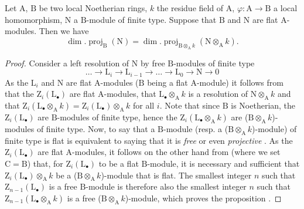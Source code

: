 \begin{proposition}[6.2.3]
\label{IV.6.2.3}
Let $\mathrm{A}$, $\mathrm{B}$ be two local Noetherian rings, $k$ the residue field of $\mathrm{A}$, $\varphi:\mathrm{A}\to\mathrm{B}$ a local homomorphism, $\mathrm{N}$ a $\mathrm{B}$-module of finite type.
Suppose that $\mathrm{B}$ and $\mathrm{N}$ are flat $\mathrm{A}$-modules.
Then we have
\begin{equation}
  \dim.\operatorname{proj}_\mathrm{B}(\mathrm{N})=\dim.\operatorname{proj}_{\mathrm{B}\otimes_\mathrm{A} k}(\mathrm{N}\otimes_\mathrm{A} k).
  \label{IV.6.2.3.1}
\tag{6.2.3.1}
\end{equation}
\end{proposition}

\begin{proof}
Consider a left resolution of $\mathrm{N}$ by free $\mathrm{B}$-modules of finite type
\[
  \ldots\to\mathrm{L}_i\to\mathrm{L}_{i-1}\to\ldots\to\mathrm{L}_0\to\mathrm{N}\to 0
\]
As the $\mathrm{L}_i$ and $\mathrm{N}$ are flat $\mathrm{A}$-modules ($\mathrm{B}$ being a flat $\mathrm{A}$-module) it follows from  that the $\mathrm{Z}_i(\mathrm{L}_\bullet)$ are flat $\mathrm{A}$-modules, that $\mathrm{L}_\bullet\otimes_\mathrm{A} k$ is a resolution of $\mathrm{N}\otimes_\mathrm{A} k$ and that $\mathrm{Z}_i(\mathrm{L}_\bullet\otimes_\mathrm{A} k)=\mathrm{Z}_i(\mathrm{L}_\bullet)\otimes_\mathrm{A} k$ for all $i$.
Note that since $\mathrm{B}$ is Noetherian, the $\mathrm{Z}_i(\mathrm{L}_\bullet)$ are $\mathrm{B}$-modules of finite type, hence the $\mathrm{Z}_i(\mathrm{L}_\bullet\otimes_\mathrm{A} k)$ are ($\mathrm{B}\otimes_\mathrm{A} k$)-modules of finite type.
Now, to say that a $\mathrm{B}$-module (resp. a ($\mathrm{B}\otimes_\mathrm{A} k$)-module) of finite type is flat is equivalent to saying that it is \emph{free} or even \emph{projective} .
As the $\mathrm{Z}_i(\mathrm{L}_\bullet)$ are flat $\mathrm{A}$-modules, it follows on the other hand from  (where we set $\mathrm{C}=\mathrm{B}$) that, for $\mathrm{Z}_i(\mathrm{L}_\bullet)$ to be a flat $\mathrm{B}$-module, it is necessary and sufficient that $\mathrm{Z}_i(\mathrm{L}_\bullet)\otimes_\mathrm{A} k$ be a ($\mathrm{B}\otimes_\mathrm{A} k$)-module that is flat.
The smallest integer $n$ such that $\mathrm{Z}_{n-1}(\mathrm{L}_\bullet)$ is a free $\mathrm{B}$-module is therefore also the smallest integer $n$ such that $\mathrm{Z}_{n-1}(\mathrm{L}_\bullet\otimes_\mathrm{A} k)$ is a free ($\mathrm{B}\otimes_\mathrm{A} k$)-module, which proves the proposition .
\end{proof}

